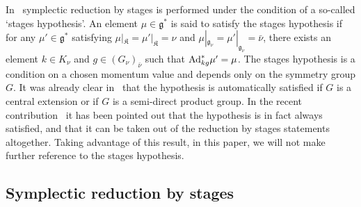 \documentclass[pdftex]{sigma}
\newcommand{\lag}{\mathfrak{g}}
\newcommand{\lak}{\mathfrak{K}}
\begin{document}
In~\cite{MarsdenHamRed} symplectic reduction by stages is performed under the condition of a so-called `stages hypothesis'. An element $\mu\in\lag^*$ is said to satisfy the stages hypothesis if for any $\mu'\in\lag^*$ satisfying $\mu|_\lak=\mu'|_\lak=\nu$ and $\mu|_{\lag_\nu} = \mu'|_{\lag_\nu} =\bar\nu$, there exists an element $k\in K_\nu$ and $g\in (G_\nu)_{\bar\nu}$ such that ${\rm Ad}^*_{kg} \mu'= \mu$.
The stages hypothesis is a condition on a chosen momentum value and depends only on the symmetry group $G$. It was already clear in~\cite{MarsdenHamRed} that the hypothesis is automatically satisf\/ied if $G$ is a central extension or if $G$ is a semi-direct product group. In the recent contribution~\cite{mikityuk} it has been pointed out that the hypothesis is in fact always satisf\/ied, and that it can be taken out of the reduction by stages statements altogether. Taking advantage of this result, in this paper, we will not make further reference to the stages hypothesis.


\subsection{Symplectic reduction by stages}\label{section6.1}
\end{document}
